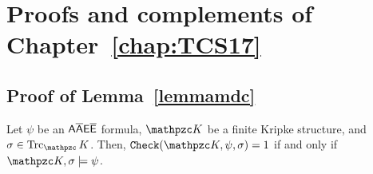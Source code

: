 \chapter{Proofs and complements of Chapter~\ref{chap:TCS17}}
\minitoc\mtcskip

\section{Proof of Lemma~\ref{lemmamdc}}\label{proof:lemmamdc}

\begin{lemma*}[\ref{lemmamdc}]
Let $\psi$ be an $\mathsf{A\overline{A}E\overline{E}}$ formula, $\Ku$ be a finite Kripke structure, and $\sigma\in\Trk_\Ku$. Then, $\texttt{Check}(\Ku, \psi,\sigma)=1$ if and only if $\Ku,\sigma\models \psi$.
\end{lemma*}

